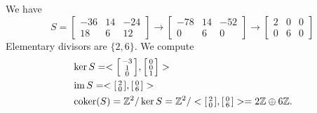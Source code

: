 \begin{exercise}{2}
    We have
    \begin{equation*}
        S =
        \begin{bmatrix}
            -36 & 14 & -24 \\
            18 & 6 & 12
        \end{bmatrix}
        \rightarrow
        \begin{bmatrix}
            -78 & 14 & -52 \\
            0 & 6 & 0
        \end{bmatrix}
        \rightarrow
        \begin{bmatrix}
            2 & 0 & 0 \\
            0 & 6 & 0
        \end{bmatrix}
    \end{equation*}
    Elementary divisors are $\{2, 6\}$.
    We compute
    \begin{align*}
        &\ker{S} = < \begin{bsmallmatrix} -3 \\ 1 \\ 0 \end{bsmallmatrix},
            \begin{bsmallmatrix} 0 \\ 0 \\ 1 \end{bsmallmatrix} > \\
        &\operatorname{im}{S} = < \begin{bsmallmatrix} 2 \\ 0 \end{bsmallmatrix},
            \begin{bsmallmatrix} 0 \\ 6 \end{bsmallmatrix} > \\
        &\operatorname{coker}(S) = \mathbb{Z}^2 / \ker S = \mathbb{Z}^2 / < \begin{bsmallmatrix} 2 \\ 0
            \end{bsmallmatrix}, \begin{bsmallmatrix} 0 \\ 6 \end{bsmallmatrix} >
                = 2 \mathbb{Z} \oplus 6 \mathbb{Z}.
    \end{align*}
\end{exercise}

